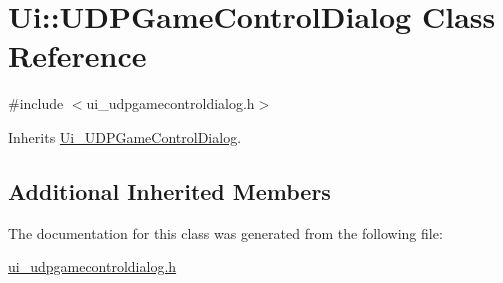 \hypertarget{class_ui_1_1_u_d_p_game_control_dialog}{\section{Ui\-:\-:U\-D\-P\-Game\-Control\-Dialog Class Reference}
\label{class_ui_1_1_u_d_p_game_control_dialog}
}


{\ttfamily \#include $<$ui\-\_\-udpgamecontroldialog.\-h$>$}



Inherits \hyperlink{class_ui___u_d_p_game_control_dialog}{Ui\-\_\-\-U\-D\-P\-Game\-Control\-Dialog}.

\subsection*{Additional Inherited Members}


The documentation for this class was generated from the following file\-:\begin{DoxyCompactItemize}
\item 
\hyperlink{ui__udpgamecontroldialog_8h}{ui\-\_\-udpgamecontroldialog.\-h}\end{DoxyCompactItemize}
